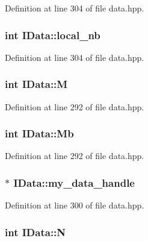 Definition at line 304 of file data.hpp.\hypertarget{class_i_data_a918da97f18b81ef440a65c7cde8f3438}{
\subsubsection[{local\_\-nb}]{\setlength{\rightskip}{0pt plus 5cm}int {\bf IData::local\_\-nb}}}
\label{class_i_data_a918da97f18b81ef440a65c7cde8f3438}


Definition at line 304 of file data.hpp.\hypertarget{class_i_data_aebf70e773a06212897c33d7512f9d344}{
\subsubsection[{M}]{\setlength{\rightskip}{0pt plus 5cm}int {\bf IData::M}}}
\label{class_i_data_aebf70e773a06212897c33d7512f9d344}


Definition at line 292 of file data.hpp.\hypertarget{class_i_data_a68696027e7617a3480fd0ae0a70df7fc}{
\subsubsection[{Mb}]{\setlength{\rightskip}{0pt plus 5cm}int {\bf IData::Mb}}}
\label{class_i_data_a68696027e7617a3480fd0ae0a70df7fc}


Definition at line 292 of file data.hpp.\hypertarget{class_i_data_abd6a79717af4efae6236df2bf35f11a7}{
\subsubsection[{my\_\-data\_\-handle}]{$\ast$ {\bf IData::my\_\-data\_\-handle}}}
\label{class_i_data_abd6a79717af4efae6236df2bf35f11a7}


Definition at line 300 of file data.hpp.\hypertarget{class_i_data_ae61dc22b2bb9c233eb93d891af16d220}{
\subsubsection[{N}]{\setlength{\rightskip}{0pt plus 5cm}int {\bf IData::N}}}
\label{class_i_data_ae61dc22b2bb9c233eb93d891af16d220}


